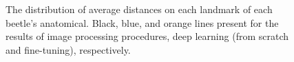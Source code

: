 \documentclass[review]{elsarticle}
\begin{document}
\begin{figure}[htbp]
    \centering
    ~~
	\\
    ~~
	\\
    \caption{The distribution of average distances on each landmark of each beetle's anatomical. Black, blue, and orange lines present for the results of image processing procedures, deep learning (from scratch and fine-tuning), respectively. }
    \label{figdist5parts}
\end{figure}
\end{document}
